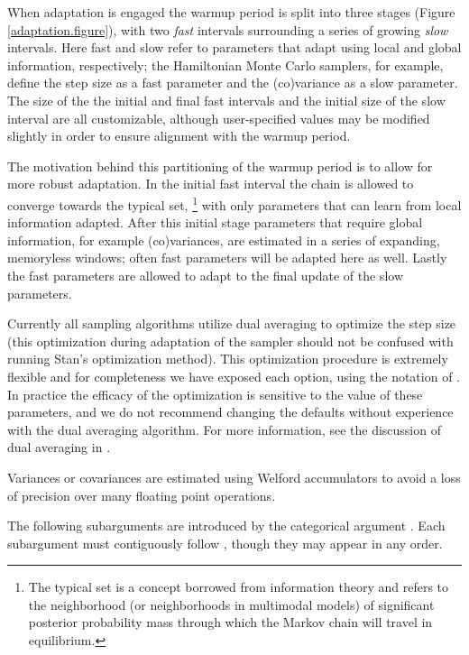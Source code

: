 When adaptation is engaged the warmup period is split into three
stages (Figure \ref{adaptation.figure}), with two \textit{fast} intervals
surrounding a series of growing \textit{slow} intervals.  Here fast
and slow refer to parameters that adapt using local and global
information, respectively; the Hamiltonian Monte Carlo samplers,
for example, define the step size as a fast parameter and 
the (co)variance as a slow parameter.  The size of the the initial
and final fast intervals and the initial size of the slow interval
are all customizable, although user-specified values may be modified 
slightly in order to ensure alignment with the warmup period.

The motivation behind this partitioning of the warmup period is to
allow for more robust adaptation.  In the initial fast interval the
chain is allowed to converge towards the typical set,%
%
\footnote{The typical set is a concept borrowed from information
theory and refers to the neighborhood (or neighborhoods in multimodal models)
of significant posterior probability mass through which the Markov chain
will travel in equilibrium.}
%
with only parameters that can learn from local information adapted.
After this initial stage parameters that require global information,
for example (co)variances, are estimated in a series of expanding,
memoryless windows; often fast parameters will be adapted here
as well.  Lastly the fast parameters are allowed to adapt to the final 
update of the slow parameters.

Currently all \Stan sampling algorithms utilize dual averaging to
optimize the step size (this optimization during adaptation of the
sampler should not be confused with running Stan's optimization method).
This optimization procedure is extremely flexible and for completeness
we have exposed each option, using the notation of
\citep{Hoffman-Gelman:2011, Hoffman-Gelman:2013}.  In practice the
efficacy of the optimization is sensitive to the value of these
parameters, and we do not recommend changing the defaults without
experience with the dual averaging algorithm.  For more information,
see the discussion of dual averaging in \citep{Hoffman-Gelman:2011,
 Hoffman-Gelman:2013}.
  
Variances or covariances are estimated using Welford accumulators
to avoid a loss of precision over many floating point operations.

The following subarguments are introduced by the categorical argument
.  Each subargument must contiguously follow ,
though they may appear in any order.  

